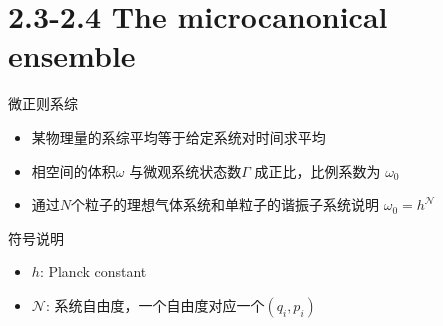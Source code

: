 \documentclass{ctexbeamer}
\begin{document}
\section{2.3-2.4 The microcanonical ensemble}
\begin{frame}{微正则系综}
    \begin{itemize}
        \item 某物理量的系综平均等于给定系统对时间求平均
        \item 相空间的体积$\omega$
        与微观系统状态数$\Gamma$
        成正比，比例系数为 $\omega_0$
        \item 通过$N$个粒子的理想气体系统和单粒子的谐振子系统说明 $\omega_0=h^{\mathcal{N}}$
    \end{itemize}
    \begin{block}{符号说明}
    \begin{itemize}
        \item $h$: Planck constant
        \item $\mathcal{N}$: 系统自由度，一个自由度对应一个$(q_i, p_i)$
    \end{itemize}
    \end{block}
\end{frame}
\end{document}
